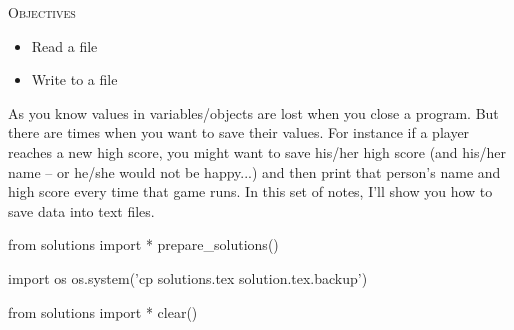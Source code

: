 
\textsc{Objectives}

\begin{itemize}
\item
  Read a file
\item
  Write to a file
\end{itemize}

As you know values in variables/objects are lost when you close a
program. But there are times when you want to save their values. For
instance if a player reaches a new high score, you might want to save
his/her high score (and his/her name -- or he/she would not be happy...)
and then print that person's name and high score every
time that game runs. In this set of notes, I'll show you
how to save data into text files.











\begin{python0}
from solutions import *
prepare_solutions()
\end{python0}
\begin{python}
import os
os.system('cp solutions.tex solution.tex.backup')  
\end{python}

\begin{python0}
from solutions import *
clear()
\end{python0}
